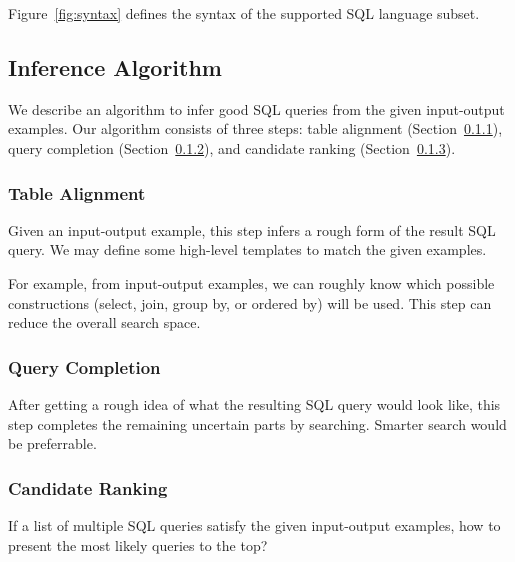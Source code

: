 Figure~\ref{fig:syntax} defines the syntax of the supported
SQL language subset.



\subsection{Inference Algorithm}

We describe an algorithm to infer good SQL queries from the given
input-output examples. Our algorithm consists of three steps:
table alignment (Section~\ref{sec:alignment}),
query completion (Section~\ref{sec:completion}), and
candidate ranking (Section~\ref{sec:ranking}).


\subsubsection{Table Alignment}
\label{sec:alignment}

Given an input-output example, this step infers a rough form of the
result SQL query. We may define some high-level templates to match
the given examples.

For example, from input-output examples, we can roughly know which
possible constructions (select, join, group by, or ordered by) will
be used. This step can reduce the overall search space.

\subsubsection{Query Completion}
\label{sec:completion}

After getting a rough idea of what the resulting SQL query would
look like, this step completes the remaining uncertain parts by
searching. Smarter search would be preferrable.

\subsubsection{Candidate Ranking}
\label{sec:ranking}

If a list of multiple SQL queries satisfy the given input-output examples, how
to present the most likely queries to the top?

